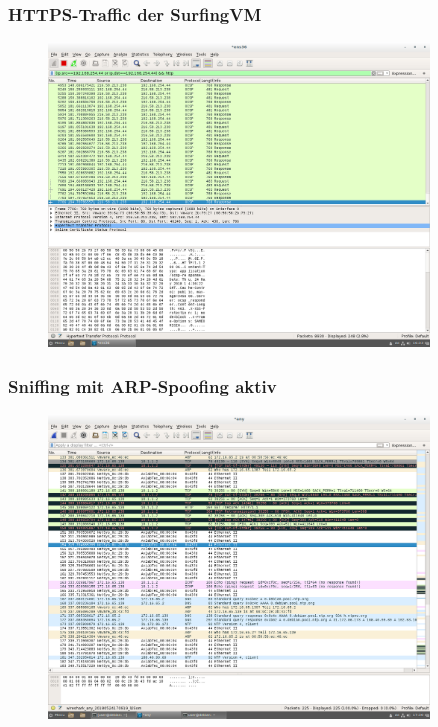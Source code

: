 \documentclass[12pt]{article}
\theoremstyle{plain}
\begin{document}
\subsubsection*{HTTPS-Traffic der SurfingVM}
\begin{figure}[!ht]
	\centering
     \includegraphics[width=0.9\textwidth]{Bilder/https_traffic_surfingvm.png}
\end{figure}
\newpage
\subsubsection*{Sniffing mit ARP-Spoofing aktiv}
\begin{figure}[!ht]
	\centering
     \includegraphics[width=0.9\textwidth]{Bilder/sniffing_mit_arp.png}
\end{figure}
\newpage
\end{document}
